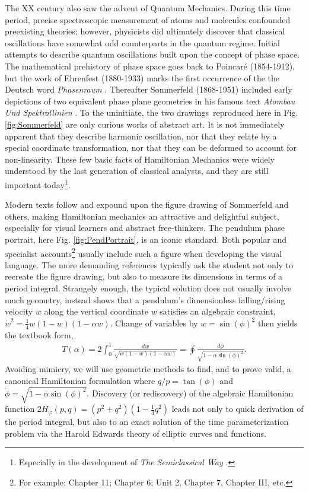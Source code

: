 \documentclass[nofootinbib,preprint]{revtex4-1}
\begin{document}
The XX century also saw the advent of Quantum Mechanics. During this time period, precise spectroscopic 
measurement of atoms and molecules confounded preexisting theories; however, physicists did ultimately 
discover that classical oscillations have 
somewhat odd counterparts in the quantum regime. Initial attempts to describe quantum oscillations 
built upon the concept of phase space. The mathematical prehistory of phase space goes back to Poincar\'{e} 
(1854-1912), but the work of Ehrenfest (1880-1933) marks the first occurrence of the the Deutsch 
word \textit{Phasenraum} \cite{NOLTE2010}. Thereafter Sommerfeld (1868-1951) included early depictions 
of two equivalent phase plane geometries in his famous text \textit{Atombau Und Spektrallinien} \cite{SOMMERFELD1921}. 
To the uninitiate, the two drawings\, reproduced here in Fig. \ref{fig:Sommerfeld} 
are only curious works of abstract art. It is not immediately apparent that they describe harmonic 
oscillation, nor that they relate by a special coordinate transformation, nor that they can be deformed 
to account for non-linearity. These few basic facts of Hamiltonian Mechanics were widely understood by 
the last generation of classical analysts, and they are still important 
today\footnote{Especially in the development of \textit{The Semiclassical Way} \cite{HELLER2018}.}. 

Modern texts follow and expound upon the figure drawing of Sommerfeld and others, making Hamiltonian
mechanics an attractive and delightful subject, especially for visual learners and abstract 
free-thinkers. The pendulum phase portrait, here Fig. \ref{fig:PendPortrait}, is an iconic standard. 
Both popular and specialist accounts\footnote{For example: \cite{STROGATZ2019} Chapter 11; \cite{STROGATZ2018} 
Chapter 6; \cite{HARTER2019} Unit 2, Chapter 7, \cite{LL1982} Chapter III, etc.} usually include such a figure when developing the 
visual language. The more demanding references typically ask the student not only to recreate the figure 
drawing, but also to measure its dimensions in terms of a period integral. Strangely enough, the typical 
solution does not usually involve much geometry, instead shows that a pendulum's dimensionless falling/rising 
velocity $\dot{w}$ along the vertical coordinate $w$ satisfies an algebraic constraint, 
$\dot{w}^2=\frac{1}{4}w(1-w)(1-\alpha w)$. Change of variables by $w=\sin(\phi)^2$ then yields the 
textbook form, 
\begin{eqnarray}
T(\alpha) = 2 \int_{0}^{1} \frac{ dw}{\sqrt{w(1-w)(1-\alpha w)}} =
\oint \frac{ d\phi}{\sqrt{1-\alpha \sin(\phi)^2}} . \nonumber
\end{eqnarray}
Avoiding mimicry, we will use geometric methods to find, and to prove valid, a canonical 
Hamiltonian formulation where $q/p=\tan(\phi)$ and $\dot{\phi}=\sqrt{1-\alpha\sin(\phi)^2 }$. 
Discovery (or rediscovery) of the algebraic Hamiltonian function $2H_{\varphi}(p,q)=(p^2+q^2)(1-\frac{1}{4}q^2)$ 
leads not only to quick derivation of the period integral, but also to an exact solution of the time 
parameterization problem via the Harold Edwards theory of elliptic curves and
functions.  
\end{document}
